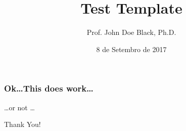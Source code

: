

%
%

%
%
\title{Test Template}
\author{Prof. John Doe Black, Ph.D.}
\date{8 de Setembro de 2017}

%
%


\begin{frame}
    \titlepage
\end{frame}

\begin{frame}
    \frametitle{Ok\ldots This does work\ldots}

    \Huge \ldots or not \ldots
\end{frame}

\begin{frame}
    \Huge Thank You!
\end{frame}


